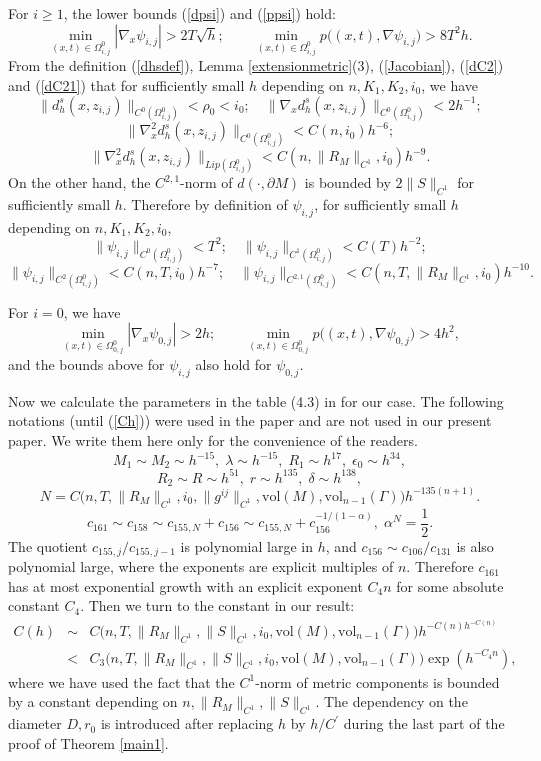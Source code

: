 \documentclass[11pt,letterpaper]{amsart}
\numberwithin{equation}{section}
\theoremstyle{definition}
\theoremstyle{plain}
\theoremstyle{definition}
\theoremstyle{plain}
\theoremstyle{definition}
\theoremstyle{plain}
\newcommand{\vol}{\textrm{vol}}
\begin{document}
\medskip
For $i\geqslant 1$, the lower bounds (\ref{dpsi}) and (\ref{ppsi}) hold:
$$\min_{(x,t)\in \Omega_{i,j}^0}|\nabla_x\psi_{i,j}|>2T\sqrt{h}; \qquad \min_{(x,t)\in \Omega_{i,j}^0}p\big((x,t),\nabla \psi_{i,j} \big) > 8T^2 h.$$
From the definition (\ref{dhsdef}), Lemma \ref{extensionmetric}(3), (\ref{Jacobian}), (\ref{dC2}) and (\ref{dC21}) that for sufficiently small $h$ depending on $n,K_1,K_2,i_0$, we have
$$\|d_h^s(x,z_{i,j})\|_{C^0(\Omega_{i,j}^0)} < \rho_0<i_0; \quad \|\nabla_x d_h^s(x,z_{i,j})\|_{C^0(\Omega_{i,j}^0)}< 2h^{-1};$$
$$\|\nabla_x^2 d_h^s(x,z_{i,j})\|_{C^0(\Omega_{i,j}^0)}< C(n,i_0)h^{-6}; $$
$$\|\nabla_x^2 d_h^s(x,z_{i,j})\|_{Lip(\Omega_{i,j}^0)}< C(n,\|R_M\|_{C^1},i_0)h^{-9}.$$
On the other hand, the $C^{2,1}$-norm of $d(\cdot,\partial M)$ is bounded by $2\|S\|_{C^1}$ for sufficiently small $h$. Therefore by definition of $\psi_{i,j}$, for sufficiently small $h$ depending on $n,K_1,K_2,i_0$,
$$\|\psi_{i,j}\|_{C^{0}(\Omega_{i,j}^0)} < T^2; \quad \|\psi_{i,j}\|_{C^{1}(\Omega_{i,j}^0)} <  C(T)h^{-2};$$
$$\|\psi_{i,j}\|_{C^{2}(\Omega_{i,j}^0)} <  C(n,T,i_0)h^{-7}; \quad \|\psi_{i,j}\|_{C^{2,1}(\Omega_{i,j}^0)} <  C(n,T,\|R_M\|_{C^1},i_0)h^{-10}.$$

For $i=0$, we have
$$\min_{(x,t)\in \Omega_{0,j}^0}|\nabla_x\psi_{0,j}|>2h; \qquad \min_{(x,t)\in \Omega_{0,j}^0}p \big((x,t),\nabla \psi_{0,j} \big) > 4h^2,$$
and the bounds above for $\psi_{i,j}$ also hold for $\psi_{0,j}$.

Now we calculate the parameters in the table (4.3) in \cite{BKL2} for our case. The following notations (until (\ref{Ch})) were used in the paper \cite{BKL2} and are not used in our present paper. We write them here only for the convenience of the readers.
$$M_1\sim M_2\sim h^{-15},\; \lambda \sim h^{-15},\; R_1\sim h^{17},\; \epsilon_0\sim h^{34},$$
$$R_2\sim R \sim h^{51},\; r\sim h^{135},\; \delta\sim h^{138},$$
$$N=C \big(n,T,\|R_M\|_{C^1},i_0,\|g^{ij}\|_{C^1},\vol(M),\vol_{n-1}(\Gamma) \big)h^{-135(n+1)}.$$
$$c_{161}\sim c_{158}\sim c_{155,N}+c_{156}\sim c_{155,N}+c_{156}^{-1/(1-\alpha)}, \; \alpha^N=\frac{1}{2}.$$
The quotient $c_{155,j}/c_{155,j-1}$ is polynomial large in $h$, and $c_{156}\sim c_{106}/c_{131}$ is also polynomial large, where the exponents are explicit multiples of $n$. Therefore $c_{161}$ has at most exponential growth with an explicit exponent $C_4 n$ for some absolute constant $C_4$. Then we turn to the constant in our result:
\begin{eqnarray}\label{Ch}
C(h)&\sim& C \big(n,T,\|R_M\|_{C^1},\|S\|_{C^1},i_0,\vol(M),\vol_{n-1}(\Gamma) \big) h^{-C(n)h^{-C(n)}} \nonumber \\
&<& C_3 \big(n,T,\|R_M\|_{C^1},\|S\|_{C^1},i_0,\vol(M),\vol_{n-1}(\Gamma) \big) \exp(h^{-C_4 n}),
\end{eqnarray}
where we have used the fact that the $C^1$-norm of metric components is bounded by a constant depending on $n,\|R_M\|_{C^1},\|S\|_{C^1}$. The dependency on the diameter $D,r_0$ is introduced after replacing $h$ by $h/C^{\prime}$ during the last part of the proof of Theorem \ref{main1}.
\end{document}
